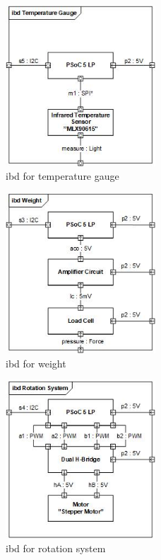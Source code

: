 \begin{figure}[h]
	\centering
	\includegraphics[width=0.5\textwidth]{Images/Hardwarearkitektur/IBD_Temperature_Gauge_JPEG.jpg}
	\caption{ibd for temperature gauge}
	\label{fig:ibd_temp}
\end{figure}
\FloatBarrier

\begin{figure}[h]
	\centering
	\includegraphics[width=0.5\textwidth]{Images/Hardwarearkitektur/IBD_Weight_JPEG.jpg}
	\caption{ibd for weight}
	\label{fig:ibd_weight}
\end{figure}
\FloatBarrier

\begin{figure}[h]
	\centering
	\includegraphics[width=0.5\textwidth]{Images/Hardwarearkitektur/IBD_Rotation_System_JPEG.jpg}
	\caption{ibd for rotation system}
	\label{fig:ibd_ratation}
\end{figure}
\FloatBarrier

